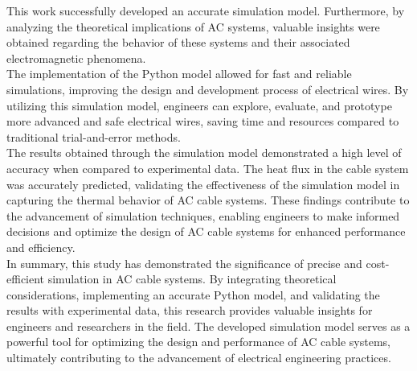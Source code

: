 This work successfully developed an accurate simulation model. Furthermore, by analyzing the theoretical implications of AC systems, valuable insights were obtained regarding the behavior of these systems and their associated electromagnetic phenomena.
\\

The implementation of the Python model allowed for fast and reliable simulations, improving the design and development process of electrical wires. By utilizing this simulation model, engineers can explore, evaluate, and prototype more advanced and safe electrical wires, saving time and resources compared to traditional trial-and-error methods.
\\

The results obtained through the simulation model demonstrated a high level of accuracy when compared to experimental data. The heat flux in the cable system was accurately predicted, validating the effectiveness of the simulation model in capturing the thermal behavior of AC cable systems. These findings contribute to the advancement of simulation techniques, enabling engineers to make informed decisions and optimize the design of AC cable systems for enhanced performance and efficiency.
\\

In summary, this study has demonstrated the significance of precise and cost-efficient simulation in AC cable systems. By integrating theoretical considerations, implementing an accurate Python model, and validating the results with experimental data, this research provides valuable insights for engineers and researchers in the field. The developed simulation model serves as a powerful tool for optimizing the design and performance of AC cable systems, ultimately contributing to the advancement of electrical engineering practices.